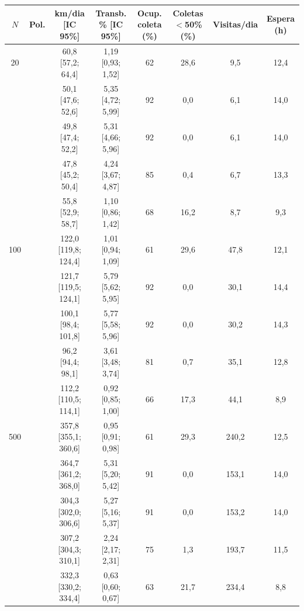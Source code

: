 \begin{tabular}{@{}clcccccc@{}}
\toprule
$N$ & Pol. & km/dia [IC 95\%] & Transb. \% [IC 95\%] & Ocup. coleta (\%) & Coletas $<$50\% (\%) & Visitas/dia & Espera (h) \\
\midrule
20 & \polA{} & 60,8 [57,2; 64,4] & 1,19 [0,93; 1,52] & 62 & 28,6 & 9,5 & 12,4 \\
 & \polB{} & 50,1 [47,6; 52,6] & 5,35 [4,72; 5,99] & 92 & 0,0 & 6,1 & 14,0 \\
 & \polBOR{} & 49,8 [47,4; 52,2] & 5,31 [4,66; 5,96] & 92 & 0,0 & 6,1 & 14,0 \\
 & \polC{} & 47,8 [45,2; 50,4] & 4,24 [3,67; 4,87] & 85 & 0,4 & 6,7 & 13,3 \\
 & \polD{} & 55,8 [52,9; 58,7] & 1,10 [0,86; 1,42] & 68 & 16,2 & 8,7 & 9,3 \\
\midrule
100 & \polA{} & 122,0 [119,8; 124,4] & 1,01 [0,94; 1,09] & 61 & 29,6 & 47,8 & 12,1 \\
 & \polB{} & 121,7 [119,5; 124,1] & 5,79 [5,62; 5,95] & 92 & 0,0 & 30,1 & 14,4 \\
 & \polBOR{} & 100,1 [98,4; 101,8] & 5,77 [5,58; 5,96] & 92 & 0,0 & 30,2 & 14,3 \\
 & \polC{} & 96,2 [94,4; 98,1] & 3,61 [3,48; 3,74] & 81 & 0,7 & 35,1 & 12,8 \\
 & \polD{} & 112,2 [110,5; 114,1] & 0,92 [0,85; 1,00] & 66 & 17,3 & 44,1 & 8,9 \\
\midrule
500 & \polA{} & 357,8 [355,1; 360,6] & 0,95 [0,91; 0,98] & 61 & 29,3 & 240,2 & 12,5 \\
 & \polB{} & 364,7 [361,2; 368,0] & 5,31 [5,20; 5,42] & 91 & 0,0 & 153,1 & 14,0 \\
 & \polBOR{} & 304,3 [302,0; 306,6] & 5,27 [5,16; 5,37] & 91 & 0,0 & 153,2 & 14,0 \\
 & \polC{} & 307,2 [304,3; 310,1] & 2,24 [2,17; 2,31] & 75 & 1,3 & 193,7 & 11,5 \\
 & \polD{} & 332,3 [330,2; 334,4] & 0,63 [0,60; 0,67] & 63 & 21,7 & 234,4 & 8,8 \\
\bottomrule
\end{tabular}

